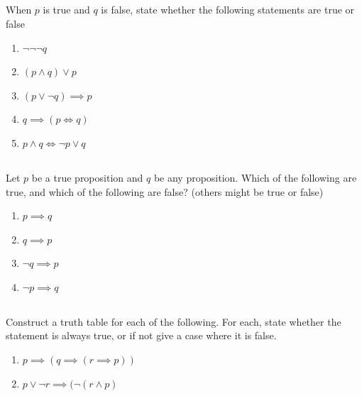 \documentclass[twocolumn]{article}
\newcommand\mrk[1]{}
\begin{document}
\subsection{}

When $p$ is true and $q$ is false, state whether the following statements are true or false

\begin{enumerate}
    \item $\neg \neg \neg q$ \mrk{1}
    \item $(p \wedge q) \vee p$ \mrk{1}
    \item $(p \vee \neg q) \implies p$ \mrk{1}
    \item $q \implies (p \Longleftrightarrow q)$ \mrk{1}
    \item $p \wedge q \Longleftrightarrow \neg p \vee q$ \mrk{1}
\end{enumerate}

\subsection{}

Let $p$ be a true proposition and $q$ be any proposition. Which of the following are true, and which of the following are false? (others might be true or false)

\begin{enumerate}
    \item $p \implies q$ \mrk{1}
    \item $q \implies p$ \mrk{1}
    \item $\neg q \implies p$ \mrk{1}
    \item $\neg p \implies q$ \mrk{1}
\end{enumerate}

\subsection{}

Construct a truth table for each of the following. For each, state whether the statement is always true, or if not give a case where it is false.

\begin{enumerate}
    \item $ p \implies (q \implies ( r \implies p )) $ \mrk{2}
    \item $ p \vee \neg r \implies (\neg ( r \wedge p ) $ \mrk{2}
\end{enumerate}

\subsection{}
\end{document}
